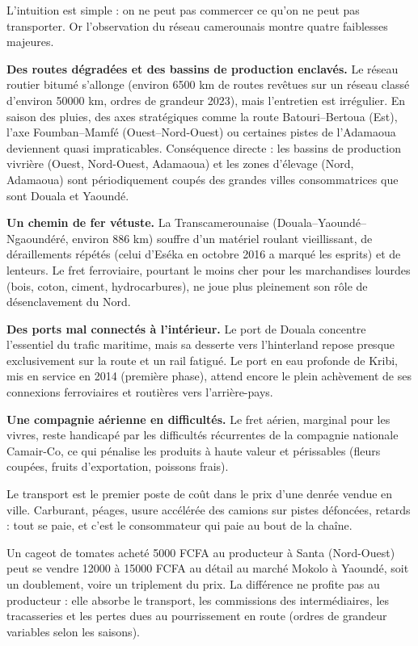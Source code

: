 \documentclass[11pt]{article}
\newcounter{popsec}
\newcounter{popsub}
\newcommand{\courssub}[1]{%
  \stepcounter{popsub}%
  \par\vspace{9pt}\noindent{\popxbold\fontsize{11.5}{13}\selectfont\color{popink}{\color{poporange}\thepopsec.\thepopsub}\hspace{6pt}#1}\par\nopagebreak\vspace{4pt}
}
\begin{document}
L'intuition est simple : on ne peut pas commercer ce qu'on ne peut pas transporter. Or l'observation du réseau camerounais montre quatre faiblesses majeures.

\textbf{Des routes dégradées et des bassins de production enclavés.} Le réseau routier bitumé s'allonge (environ \num{6500} km de routes revêtues sur un réseau classé d'environ \num{50000} km, ordres de grandeur 2023), mais l'entretien est irrégulier. En saison des pluies, des axes stratégiques comme la route Batouri--Bertoua (Est), l'axe Foumban--Mamfé (Ouest--Nord-Ouest) ou certaines pistes de l'Adamaoua deviennent quasi impraticables. Conséquence directe : les bassins de production vivrière (Ouest, Nord-Ouest, Adamaoua) et les zones d'élevage (Nord, Adamaoua) sont périodiquement coupés des grandes villes consommatrices que sont Douala et Yaoundé.

\textbf{Un chemin de fer vétuste.} La Transcamerounaise (Douala--Yaoundé--Ngaoundéré, environ \num{886} km) souffre d'un matériel roulant vieillissant, de déraillements répétés (celui d'Eséka en octobre 2016 a marqué les esprits) et de lenteurs. Le fret ferroviaire, pourtant le moins cher pour les marchandises lourdes (bois, coton, ciment, hydrocarbures), ne joue plus pleinement son rôle de désenclavement du Nord.

\textbf{Des ports mal connectés à l'intérieur.} Le port de Douala concentre l'essentiel du trafic maritime, mais sa desserte vers l'hinterland repose presque exclusivement sur la route et un rail fatigué. Le port en eau profonde de Kribi, mis en service en 2014 (première phase), attend encore le plein achèvement de ses connexions ferroviaires et routières vers l'arrière-pays.

\textbf{Une compagnie aérienne en difficultés.} Le fret aérien, marginal pour les vivres, reste handicapé par les difficultés récurrentes de la compagnie nationale Camair-Co, ce qui pénalise les produits à haute valeur et périssables (fleurs coupées, fruits d'exportation, poissons frais).

\courssub{Le coût élevé du transport et les pertes post-récolte}

Le transport est le premier poste de coût dans le prix d'une denrée vendue en ville. Carburant, péages, usure accélérée des camions sur pistes défoncées, retards : tout se paie, et c'est le consommateur qui paie au bout de la chaîne.

\begin{exemplebox}
Un cageot de tomates acheté \num{5000} FCFA au producteur à Santa (Nord-Ouest) peut se vendre \num{12000} à \num{15000} FCFA au détail au marché Mokolo à Yaoundé, soit un doublement, voire un triplement du prix. La différence ne profite pas au producteur : elle absorbe le transport, les commissions des intermédiaires, les tracasseries et les pertes dues au pourrissement en route (ordres de grandeur variables selon les saisons).
\end{exemplebox}
\end{document}

